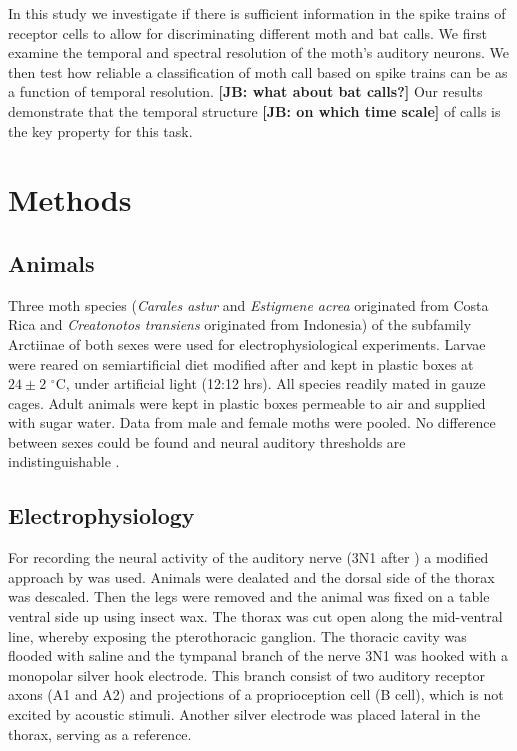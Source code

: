 \documentclass[12pt,a4paper]{article}
\newcommand{\species}[1]{\textit{#1}}
\newcommand{\note}[2][]{\textbf{[#1: #2]}}
\newcommand{\notejb}[1]{\note[JB]{#1}}
\begin{document}
In this study we investigate if there is sufficient information in the spike trains of receptor cells to allow for discriminating different moth and bat calls. We first examine the temporal and spectral resolution of the moth's auditory neurons. We then test how reliable a classification of moth call based on spike trains can be as a function of temporal resolution. \notejb{what about bat calls?}
Our results demonstrate that the temporal structure \notejb{on which time scale} of calls is the key property for this task. 
\newpage

\section{Methods}
\subsection{Animals}
Three moth species (\species{Carales astur} and \species{Estigmene acrea} originated from Costa Rica and \species{Creatonotos transiens} originated from Indonesia) of the subfamily Arctiinae of both sexes were used for electrophysiological experiments. Larvae were reared on semiartificial diet modified after \cite{bergomaz1986} and kept in plastic boxes at $24\pm2$ $^{\circ}$C, under artificial light (12:12 hrs). All species readily mated in gauze cages. Adult animals were kept in plastic boxes permeable to air and supplied with sugar water. Data from male and female moths were pooled. No difference between sexes could be found and neural auditory thresholds are indistinguishable
\cite{terhofstede2013}.        

\subsection{Electrophysiology}
For recording the neural activity of the auditory nerve (3N1 after \cite{nuesch1957}) a modified approach by \cite{roeder1957} was used. Animals were dealated and the dorsal side of the thorax was descaled. Then the legs were removed and the animal was fixed on a table ventral side up using insect wax. The thorax was cut open along the mid-ventral line, whereby exposing the pterothoracic ganglion. The thoracic cavity was flooded with saline and the tympanal branch of the nerve 3N1 was hooked with a monopolar silver hook electrode. This branch consist of two auditory receptor axons (A1 and A2) and projections of a proprioception cell (B cell), which is not excited by acoustic stimuli. Another silver electrode was placed lateral in the thorax, serving as a reference.   
\end{document}
